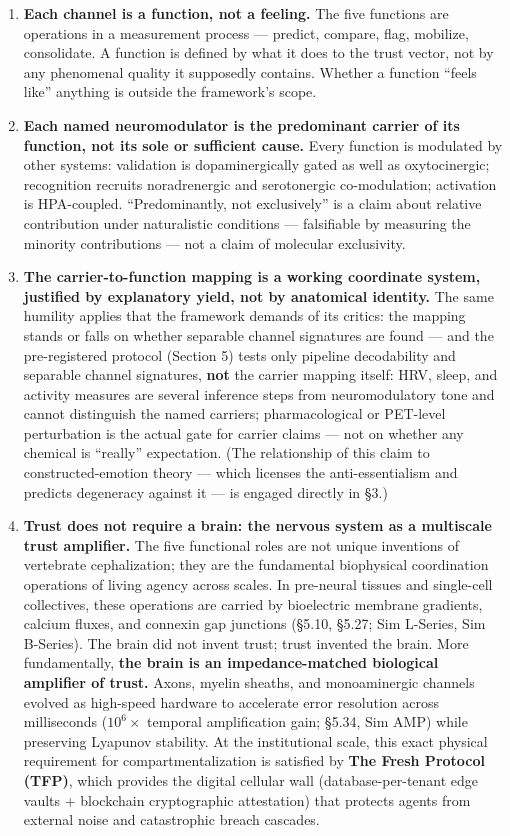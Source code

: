 \documentclass[
]{article}
\providecommand{\tightlist}{%
  \setlength{\itemsep}{0pt}\setlength{\parskip}{0pt}}
\begin{document}
\begin{enumerate}
\def\labelenumi{\arabic{enumi}.}
\tightlist
\item
  \textbf{Each channel is a function, not a feeling.} The five functions
  are operations in a measurement process --- predict, compare, flag,
  mobilize, consolidate. A function is defined by what it does to the
  trust vector, not by any phenomenal quality it supposedly contains.
  Whether a function ``feels like'' anything is outside the framework's
  scope.
\item
  \textbf{Each named neuromodulator is the predominant carrier of its
  function, not its sole or sufficient cause.} Every function is
  modulated by other systems: validation is dopaminergically gated as
  well as oxytocinergic; recognition recruits noradrenergic and
  serotonergic co-modulation; activation is HPA-coupled.
  ``Predominantly, not exclusively'' is a claim about relative
  contribution under naturalistic conditions --- falsifiable by
  measuring the minority contributions --- not a claim of molecular
  exclusivity.
\item
  \textbf{The carrier-to-function mapping is a working coordinate
  system, justified by explanatory yield, not by anatomical identity.}
  The same humility applies that the framework demands of its critics:
  the mapping stands or falls on whether separable channel signatures
  are found --- and the pre-registered protocol (Section 5) tests only
  pipeline decodability and separable channel signatures, \textbf{not}
  the carrier mapping itself: HRV, sleep, and activity measures are
  several inference steps from neuromodulatory tone and cannot
  distinguish the named carriers; pharmacological or PET-level
  perturbation is the actual gate for carrier claims --- not on whether
  any chemical is ``really'' expectation. (The relationship of this
  claim to constructed-emotion theory --- which licenses the
  anti-essentialism and predicts degeneracy against it --- is engaged
  directly in §3.)
\item
  \textbf{Trust does not require a brain: the nervous system as a
  multiscale trust amplifier.} The five functional roles are not unique
  inventions of vertebrate cephalization; they are the fundamental
  biophysical coordination operations of living agency across scales. In
  pre-neural tissues and single-cell collectives, these operations are
  carried by bioelectric membrane gradients, calcium fluxes, and
  connexin gap junctions (§5.10, §5.27; Sim L-Series, Sim B-Series). The
  brain did not invent trust; trust invented the brain. More
  fundamentally, \textbf{the brain is an impedance-matched biological
  amplifier of trust.} Axons, myelin sheaths, and monoaminergic channels
  evolved as high-speed hardware to accelerate error resolution across
  milliseconds (\(10^6\times\) temporal amplification gain; §5.34, Sim
  AMP) while preserving Lyapunov stability. At the institutional scale,
  this exact physical requirement for compartmentalization is satisfied
  by \textbf{The Fresh Protocol (TFP)}, which provides the digital
  cellular wall (database-per-tenant edge vaults + blockchain
  cryptographic attestation) that protects agents from external noise
  and catastrophic breach cascades.
\end{enumerate}
\end{document}
